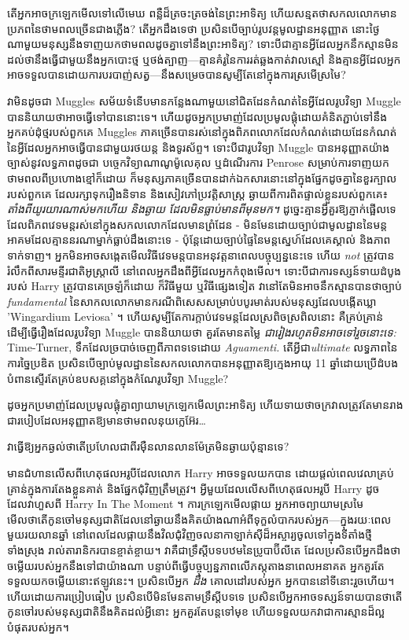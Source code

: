 តើអ្នកអាចក្រឡេកមើលទៅលើមេឃ ពន្លឺដ៏ត្រចះត្រចង់នៃព្រះអាទិត្យ ហើយសន្មតថាសកលលោកមានប្រភពនៃថាមពលច្រើនជាងភ្លើង? តើអ្នកដឹងទេថា ប្រសិនបើច្បាប់រូបវន្តមូលដ្ឋានអនុញ្ញាត នោះថ្ងៃណាមួយមនុស្សនឹងទាញយកថាមពលដូចគ្នាទៅនឹងព្រះអាទិត្យ? ទោះបីជាគ្មានអ្វីដែលអ្នកនឹកស្មានមិនដល់ថានឹងធ្វើជាមួយនឹងអ្នកបោះថ្ម ឬថង់ត្បាញ—គ្មានគំរូនៃការរត់ឆ្លងកាត់វាលស្មៅ និងគ្មានអ្វីដែលអ្នកអាចទទួលបានដោយការបរបាញ់សត្វ—នឹងសម្រេចបានសូម្បីតែនៅក្នុងការស្រមើស្រមៃ?

វាមិនដូចជា Muggles សម័យទំនើបមានកន្លែងណាមួយនៅជិតដែនកំណត់នៃអ្វីដែលរូបវិទ្យា Muggle បាននិយាយថាអាចធ្វើទៅបាននោះទេ។ ហើយដូចអ្នកប្រមាញ់ដែលប្រមូលផ្ដុំដោយគំនិតភ្ជាប់ទៅនឹងអ្នកគប់ដុំថ្មរបស់ពួកគេ Muggles ភាគច្រើនបានរស់នៅក្នុងពិភពលោកដែលកំណត់ដោយដែនកំណត់នៃអ្វីដែលអ្នកអាចធ្វើបានជាមួយរថយន្ត និងទូរស័ព្ទ។ ទោះបីជារូបវិទ្យា Muggle បានអនុញ្ញាតយ៉ាងច្បាស់នូវលទ្ធភាពដូចជា បច្ចេកវិទ្យាណាណូម៉ូលេគុល ឬដំណើរការ Penrose សម្រាប់ការទាញយកថាមពលពីប្រហោងខ្មៅក៏ដោយ ក៏មនុស្សភាគច្រើនបានដាក់ឯកសារនោះនៅក្នុងផ្នែកដូចគ្នានៃខួរក្បាលរបស់ពួកគេ ដែលរក្សាទុករឿងនិទាន និងសៀវភៅប្រវត្តិសាស្ត្រ ឆ្ងាយពីការពិតផ្ទាល់ខ្លួនរបស់ពួកគេ៖ \emph{តាំងពីយូរយារណាស់មកហើយ និងឆ្ងាយ ដែលមិនធ្លាប់មានពីមុនមក។} ដូច្នេះគ្មានអ្វីគួរឱ្យភ្ញាក់ផ្អើលទេ ដែលពិភពវេទមន្តរស់នៅក្នុងសកលលោកដែលមានព្រំដែន - មិនមែនដោយច្បាប់ជាមូលដ្ឋាននៃមន្តអាគមដែលគ្មាននរណាម្នាក់ធ្លាប់ដឹងនោះទេ - ប៉ុន្តែដោយច្បាប់ផ្ទៃនៃមន្តស្នេហ៍ដែលគេស្គាល់ និងភាពទាក់ទាញ។ អ្នក​មិន​អាច​សង្កេត​មើល​វិធី​វេទមន្ត​បាន​អនុវត្ត​នា​ពេល​បច្ចុប្បន្ន​នេះ​ទេ ហើយ \emph{not} ត្រូវ​បាន​រំលឹក​ពី​សារមន្ទីរជាតិ​អូស្ត្រាលី នៅ​ពេល​អ្នក​ដឹង​ពី​អ្វី​ដែល​អ្នក​កំពុង​មើល។ ទោះបីជាការទស្សន៍ទាយដំបូងរបស់ Harry ត្រូវបានគេច្រឡំក៏ដោយ ក៏វិធីមួយ ឬវិធីផ្សេងទៀត វានៅតែមិនអាចនឹកស្មានបានថាច្បាប់ \emph{fundamental} នៃសាកលលោកមានករណីពិសេសសម្រាប់បបូរមាត់របស់មនុស្សដែលបង្កើតឃ្លា 'Wingardium Leviosa' ។ ហើយសូម្បីតែការក្តាប់វេទមន្តដែលស្រពិចស្រពិលនោះ គឺគ្រប់គ្រាន់ដើម្បីធ្វើរឿងដែលរូបវិទ្យា Muggle បាននិយាយថា គួរតែមានតម្លៃ \emph{ជារៀងរហូតមិនអាចទៅរួចនោះទេ:} Time-Turner, ទឹកដែលច្របាច់ចេញពីភាពទទេដោយ \emph{Aguamenti.} តើអ្វីជា\emph{ultimate} លទ្ធភាពនៃការច្នៃប្រឌិត ប្រសិនបើច្បាប់មូលដ្ឋាននៃសកលលោកបានអនុញ្ញាតឱ្យក្មេងអាយុ 11 ឆ្នាំដោយប្រើដំបងបំពានស្ទើរតែគ្រប់ឧបសគ្គនៅក្នុងកំណែរូបវិទ្យា Muggle?

ដូច​អ្នក​ប្រមាញ់​ដែល​ប្រមូល​ផ្ដុំ​គ្នា​ព្យាយាម​ក្រឡេក​មើល​ព្រះអាទិត្យ ហើយ​ទាយ​ថា​ចក្រវាល​ត្រូវ​តែ​មាន​រាង​ជា​របៀប​ដែល​អនុញ្ញាត​ឱ្យ​មាន​ថាមពល​នុយក្លេអ៊ែរ…

វាធ្វើឱ្យអ្នកឆ្ងល់ថាតើប្រហែលជាពីរម៉ឺនលានលានម៉ែត្រមិនឆ្ងាយប៉ុន្មានទេ?

មានជំហានលើសពីហេតុផលអរូបីដែលលោក Harry អាចទទួលយកបាន ដោយផ្តល់ពេលវេលាគ្រប់គ្រាន់ក្នុងការតែងខ្លួនគាត់ និងផ្នែកជុំវិញត្រឹមត្រូវ។ អ្វីមួយដែលលើសពីហេតុផលអរូបី Harry ដូចដែលវាហួសពី Harry In The Moment ។ ការក្រឡេកមើលផ្កាយ អ្នកអាចព្យាយាមស្រមៃមើលថាតើកូនចៅមនុស្សជាតិដែលនៅឆ្ងាយនឹងគិតយ៉ាងណាអំពីទុក្ខលំបាករបស់អ្នក—ក្នុងរយៈពេលមួយរយលានឆ្នាំ នៅពេលដែលផ្កាយនឹងវិលជុំវិញចលនាកាឡាក់ស៊ីដ៏អស្ចារ្យចូលទៅក្នុងទីតាំងថ្មីទាំងស្រុង រាល់តារានិករបានខ្ចាត់ខ្ចាយ។ វាគឺជាទ្រឹស្តីបទបឋមនៃប្រូបាប៊ីលីតេ ដែលប្រសិនបើអ្នកដឹងថាចម្លើយរបស់អ្នកនឹងទៅជាយ៉ាងណា បន្ទាប់ពីធ្វើបច្ចុប្បន្នភាពលើភស្តុតាងនាពេលអនាគត អ្នកគួរតែទទួលយកចម្លើយនោះឥឡូវនេះ។ ប្រសិនបើអ្នក \emph{ដឹង} គោលដៅរបស់អ្នក អ្នកបាននៅទីនោះរួចហើយ។ ហើយដោយការប្រៀបធៀប ប្រសិនបើមិនមែនតាមទ្រឹស្តីបទទេ ប្រសិនបើអ្នកអាចទស្សន៍ទាយបានថាតើកូនចៅរបស់មនុស្សជាតិនឹងគិតដល់អ្វីនោះ អ្នកគួរតែបន្តទៅមុខ ហើយទទួលយកវាជាការស្មានដ៏ល្អបំផុតរបស់អ្នក។

